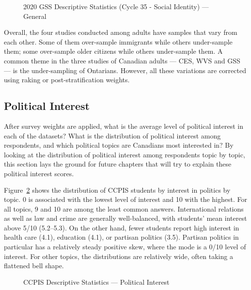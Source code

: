 \documentclass[
  letterpaper,
  DIV=11,
  numbers=noendperiod]{scrreprt}
\begin{document}
\begin{figure}


\caption{\label{fig-gss}2020 GSS Descriptive Statistics (Cycle 35 -
Social Identity) --- General}

\end{figure}%

Overall, the four studies conducted among adults have samples that vary
from each other. Some of them over-sample immigrants while others
under-sample them; some over-sample older citizens while others
under-sample them. A common theme in the three studies of Canadian
adults --- CES, WVS and GSS --- is the under-sampling of Ontarians.
However, all these variations are corrected using raking or
post-stratification weights.

\subsection{Political Interest}\label{political-interest}

After survey weights are applied, what is the average level of political
interest in each of the datasets? What is the distribution of political
interest among respondents, and which political topics are Canadians
most interested in? By looking at the distribution of political interest
among respondents topic by topic, this section lays the ground for
future chapters that will try to explain these political interest
scores.

Figure~\ref{fig-ccpis2} shows the distribution of CCPIS students by
interest in politics by topic. 0 is associated with the lowest level of
interest and 10 with the highest. For all topics, 9 and 10 are among the
least common answers. International relations as well as law and crime
are generally well-balanced, with students' mean interest above 5/10
(5.2--5.3). On the other hand, fewer students report high interest in
health care (4.1), education (4.1), or partisan politics (3.5). Partisan
politics in particular has a relatively steady positive skew, where the
mode is a 0/10 level of interest. For other topics, the distributions
are relatively wide, often taking a flattened bell shape.

\begin{figure}


\caption{\label{fig-ccpis2}CCPIS Descriptive Statistics --- Political
Interest}

\end{figure}%
\end{document}
